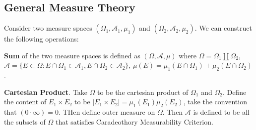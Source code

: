 
\subsection{General Measure Theory}

Consider two measure spaces $(\Omega_1, \mathcal{A}_1, \mu_1)$ and $(\Omega_2, \mathcal{A}_2, \mu_2)$. We can construct the following operations:

\textbf{Sum} of the two measure spaces is defined as $(\Omega, \mathcal{A}, \mu)$ where $\Omega = \Omega_1 \coprod \Omega_2$, $\mathcal{A} = \{E \subset \Omega: E \cap  \Omega_1 \in \mathcal{A}_1, E \cap \Omega_2 \in \mathcal{A}_2\} $, $\mu(E) = \mu_1(E \cap \Omega_1) + \mu_2 (E \cap \Omega_2)$.

\textbf{Cartesian Product}. 
Take $\Omega$ to be the cartesian product of $\Omega_1$ and $\Omega_2$. Define the content of $E_1 \times E_2$ to be $\left| E_1 \times E_2 \right|  = \mu_1(E_1) \mu_2(E_2)$, take the convention that  $(0 \cdot \infty ) = 0$. THen define outer measure on $\Omega$. Then $\mathcal{A}$ is defined to be all the subsets of $\Omega$ that satisfies Caradeothory Measurability Criterion.
